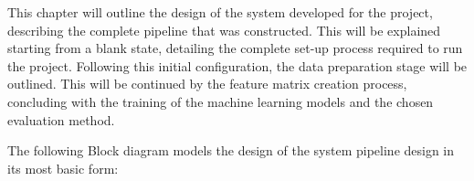 \documentclass[12pt]{report} %
\begin{document}
This chapter will outline the design of the system developed for the project, describing the complete pipeline that was constructed. This will be explained starting from a blank state, detailing the complete set-up process required to run the project. Following this initial configuration, the data preparation stage will be outlined. This will be continued by the feature matrix creation process, concluding with the training of the machine learning models and the chosen evaluation method.

The following Block diagram models the design of the system pipeline design in its most basic form:


\end{document}

